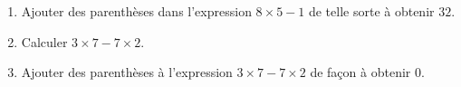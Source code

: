 
\begin{exercice}\label{exosmath-0820}

    \begin{enumerate}
        \item
            Ajouter des parenthèses dans l'expression \( 8\times 5-1\) de telle sorte à obtenir \( 32\).
        \item
            Calculer \( 3\times 7-7\times 2\). 
        \item
            Ajouter des parenthèses à l'expression \( 3\times 7-7\times 2\) de façon à obtenir \( 0\).
    \end{enumerate}

\end{exercice}
